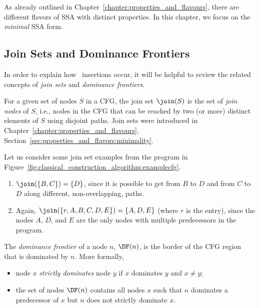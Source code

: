 {As already outlined in Chapter~\ref{chapter:properties_and_flavours},
there are different flavors of SSA with distinct properties.
In this chapter, we focus on the \textit{minimal} SSA form.

\subsection{Join Sets and Dominance Frontiers}
\label{subsec:JS-DF}
In order to explain how \phifun\ insertions occur,
it will be helpful 
to review the related concepts of \textit{join sets} and
\textit{dominance frontiers}.

For a given set of nodes $S$ in a CFG, the join set $\join(S)$
is the set of \textit{join nodes} of $S$,
i.e., nodes in the CFG that can be reached by
two (or more) distinct elements of $S$ using disjoint paths.
Join sets were introduced in Chapter~\ref{chapter:properties_and_flavours}, 
Section~\ref{sec:properties_and_flavors:minimality}.

Let us consider some join set examples from the
program in Figure~\ref{fig:classical_construction_algorithm:examplecfg}.
\begin{enumerate}
\item $\join(\{B,C\}) = \{D\}$, since it is possible to get from $B$ to $D$
and from $C$ to $D$ along different, non-overlapping, paths.
\item Again, $\join(\{r, A, B, C, D, E \}) = \{A,D,E\}$ (where $r$ is 
  the entry), since the nodes
$A$, $D$, and $E$ are the only nodes with multiple predecessors in
the program.
\end{enumerate}


The \textit{dominance frontier} of a node $n$,
$\DF(n)$, is the border of the CFG region that is dominated by $n$.
More formally,
\begin{itemize}
\item node $x$ \textit{strictly dominates} node $y$ if $x$ dominates
  $y$ and $x \neq y$;
\item the set of nodes $\DF(n)$ contains all nodes $x$ such that $n$
  dominates a predecessor of $x$ but $n$ does not strictly dominate $x$.
\end{itemize}

}

